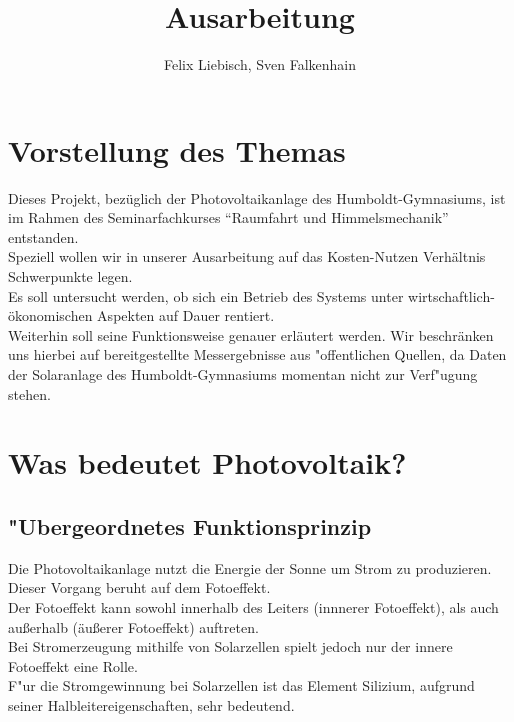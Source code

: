 \documentclass[12pt,titlepage]{article}
\begin{document}
 \title{Ausarbeitung}    
  
  \author{Felix Liebisch, Sven Falkenhain}
   
\maketitle 

\clearpage

\tableofcontents
\clearpage
 \section{Vorstellung des Themas}
 Dieses Projekt, bez\"uglich der Photovoltaikanlage des Humboldt-Gymnasiums, ist im Rahmen des Seminarfachkurses "`Raumfahrt und Himmelsmechanik"'      
 entstanden.\\
 Speziell wollen wir in unserer Ausarbeitung auf das Kosten-Nutzen Verh\"altnis Schwerpunkte legen.\\
 Es soll untersucht werden, ob sich ein Betrieb des Systems unter wirtschaftlich-\"okonomischen Aspekten auf Dauer rentiert.\\
 Weiterhin soll seine Funktionsweise genauer erl\"autert werden.
 Wir beschr\"anken uns hierbei auf bereitgestellte Messergebnisse aus "offentlichen Quellen, da Daten der Solaranlage des Humboldt-Gymnasiums momentan   nicht zur Verf"ugung stehen.
 \section{Was bedeutet Photovoltaik?}
 \subsection{ "Ubergeordnetes Funktionsprinzip} 
 Die Photovoltaikanlage nutzt die Energie der Sonne um Strom zu produzieren.\\ Dieser Vorgang beruht auf dem Fotoeffekt.\\
 Der Fotoeffekt kann sowohl innerhalb des Leiters (innnerer Fotoeffekt), als auch au\ss erhalb (\"au\ss erer Fotoeffekt) auftreten.\\
 Bei Stromerzeugung mithilfe von Solarzellen spielt jedoch nur der innere Fotoeffekt eine Rolle.\\
 F"ur die Stromgewinnung bei Solarzellen ist das Element Silizium, aufgrund seiner Halbleitereigenschaften, sehr bedeutend.\\\\\\
 
\end{document}

